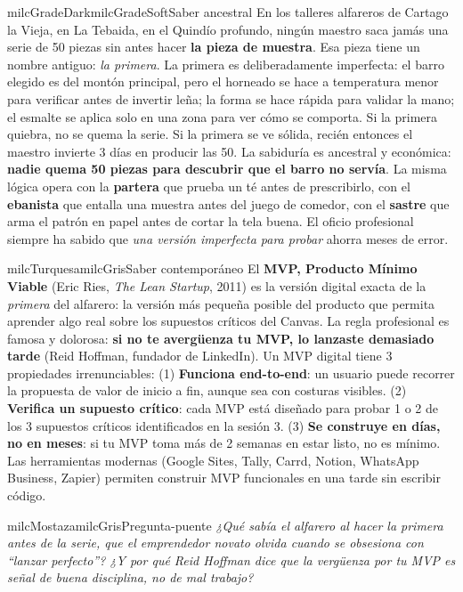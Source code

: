 \documentclass[11pt,letterpaper]{article}
\begin{document}
\begin{softbox}{milcGradeDark}{milcGradeSoft}{Saber ancestral}
En los talleres alfareros de Cartago la Vieja, en La Tebaida, en el Quindío profundo, ningún maestro saca jamás una serie de 50 piezas sin antes hacer \textbf{la pieza de muestra}. Esa pieza tiene un nombre antiguo: \emph{la primera}. La primera es deliberadamente imperfecta: el barro elegido es del montón principal, pero el horneado se hace a temperatura menor para verificar antes de invertir leña; la forma se hace rápida para validar la mano; el esmalte se aplica solo en una zona para ver cómo se comporta. Si la primera quiebra, no se quema la serie. Si la primera se ve sólida, recién entonces el maestro invierte 3 días en producir las 50. La sabiduría es ancestral y económica: \textbf{nadie quema 50 piezas para descubrir que el barro no servía}. La misma lógica opera con la \textbf{partera} que prueba un té antes de prescribirlo, con el \textbf{ebanista} que entalla una muestra antes del juego de comedor, con el \textbf{sastre} que arma el patrón en papel antes de cortar la tela buena. El oficio profesional siempre ha sabido que \emph{una versión imperfecta para probar} ahorra meses de error.
\end{softbox}

\begin{softbox}{milcTurquesa}{milcGris}{Saber contemporáneo}
El \textbf{MVP, Producto Mínimo Viable} (Eric Ries, \emph{The Lean Startup}, 2011) es la versión digital exacta de la \emph{primera} del alfarero: la versión más pequeña posible del producto que permita aprender algo real sobre los supuestos críticos del Canvas. La regla profesional es famosa y dolorosa: \textbf{si no te avergüenza tu MVP, lo lanzaste demasiado tarde} (Reid Hoffman, fundador de LinkedIn). Un MVP digital tiene 3 propiedades irrenunciables: (1) \textbf{Funciona end-to-end}: un usuario puede recorrer la propuesta de valor de inicio a fin, aunque sea con costuras visibles. (2) \textbf{Verifica un supuesto crítico}: cada MVP está diseñado para probar 1 o 2 de los 3 supuestos críticos identificados en la sesión 3. (3) \textbf{Se construye en días, no en meses}: si tu MVP toma más de 2 semanas en estar listo, no es mínimo. Las herramientas modernas (Google Sites, Tally, Carrd, Notion, WhatsApp Business, Zapier) permiten construir MVP funcionales en una tarde sin escribir código.
\end{softbox}

\begin{softbox}{milcMostaza}{milcGris}{Pregunta-puente}
\textit{¿Qué sabía el alfarero al hacer \emph{la primera} antes de la serie, que el emprendedor novato olvida cuando se obsesiona con \emph{``lanzar perfecto''}? ¿Y por qué Reid Hoffman dice que la vergüenza por tu MVP es señal de buena disciplina, no de mal trabajo?}
\end{softbox}
\end{document}

